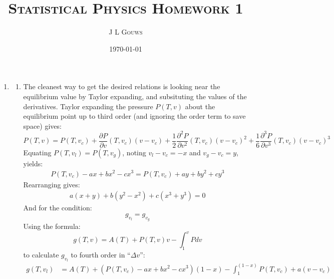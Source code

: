 \documentclass[12pt,a4]{article}
\title{
\textsc{Statistical Physics Homework 1}
}
\author{\textsc{J L Gouws}
}
\date{\today
\\[1cm]}
\begin{document}
\thispagestyle{empty}

\maketitle

\begin{enumerate}
  \item
    \begin{enumerate}
      \item
        The cleanest way to get the desired relations is looking near the equilibrium value by Taylor expanding, and subsituting the values of the derivatives.
        Taylor expanding the pressure $P(T, v)$ about the equilibrium point up to third order (and ignoring the order term to save space) gives:
        \begin{equation*}
          P (T, v) = P(T, v_c) + \frac{\partial P}{\partial v}\left(T, v_c\right)(v - v_c)  + \frac{1}{2}\frac{\partial^2 P}{\partial v^2}\left(T, v_c\right)(v - v_c)^2  + \frac{1}{6}\frac{\partial^3 P}{\partial v^3}\left(T, v_c\right)(v - v_c)^3
        \end{equation*}
        Equating $P(T, v_l) = P(T, v_g)$, noting $v_l - v_c = -x$ and $v_g - v_c = y$, yields:
        \begin{align*}
          P(T, v_c) - a x  + b x^2  - c x^3 = P(T, v_c) + a y  + b y^2  + c y^3
        \end{align*}
        Rearranging gives:
        \begin{align}
          a (x + y)  + b ( y^2 - x^2)  + c (x^3 + y ^3) = 0 \label{eq:ChemEquiEquality1}
        \end{align}
        And for the condition:
        \begin{equation*}
          g_{v_l} = g_{v_g}
        \end{equation*}
        Using the formula:
        \begin{equation*}
          g(T, v) = A (T) + P(T, v) v - \int_1 ^v P dv
        \end{equation*}
        to calculate $g_{v_l}$ to fourth order in ``$\Delta v$'':
        \begin{align*}
          g(T, v_l) &= A(T) + \left(P(T, v_c) - a x + b x^2 - c x^3\right)(1 - x) - \int_1^{(1-x)} P(T, v_c) + a (v - v_c) \\

\end{align*}
\end{enumerate}
\end{enumerate}
\end{document}
